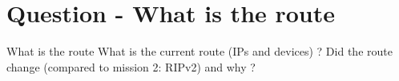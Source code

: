 \section{Question - What is the route}

\begin{questionBox}{What is the route}
    What is the current route (IPs and devices) ? Did the route change (compared to mission 2: RIPv2) and why ?
\end{questionBox}
